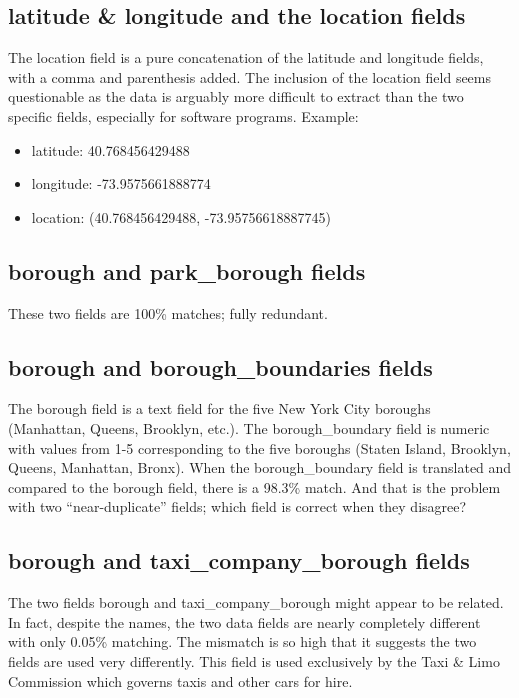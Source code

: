 \documentclass[12pt, titlepage]{article}
\begin{document}
\subsection{latitude \& longitude and the location fields}
\label{sec:latlong}
The location field is a pure concatenation of the latitude 
and longitude fields, with a comma and parenthesis 
added. The inclusion of the location field seems questionable 
as the data is arguably more difficult to extract than the 
two specific fields, especially for software programs. Example:  

\begin{itemize}
	\item  latitude: 40.768456429488
	\item  longitude: -73.9575661888774
	\item  location: (40.768456429488, -73.95756618887745)
\end{itemize}

\subsection{borough and park\_borough fields}
\label{sec:parkborough}
These two fields are 100\% matches; fully redundant.

\subsection{borough and borough\_boundaries fields}
\label{sec:boroughboundaries}
The borough field is a text field for the five New York City boroughs (Manhattan, Queens, 
Brooklyn, etc.). The borough\_boundary field is numeric with values 
from 1-5 corresponding to the five boroughs (Staten Island, Brooklyn, 
Queens, Manhattan, Bronx). When the borough\_boundary field is 
translated and compared to the borough field, there is a 
98.3\% match. And that is the problem with two ``near-duplicate'' 
fields; which field is correct when they disagree?

\subsection{borough and taxi\_company\_borough fields}
\label{sec:taxicompanyborough}
The two fields borough and taxi\_company\_borough might appear to be 
related. In fact, despite the names, the two data fields are nearly 
completely different with only 0.05\% matching. The mismatch is so 
high that it suggests the two fields are used very differently. This field 
is used exclusively by the Taxi \& Limo Commission which governs 
taxis and other cars for hire.
\end{document}
